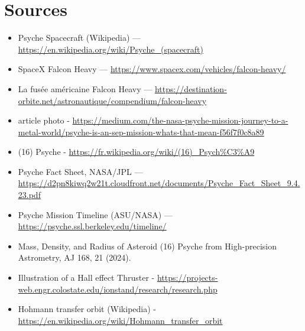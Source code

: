 \documentclass[11pt,a4paper]{article}
\begin{document}
\newpage

\section*{Sources}

\begin{itemize}
    \item [1] Psyche Spacecraft (Wikipedia) — \url{https://en.wikipedia.org/wiki/Psyche_(spacecraft)}
    \item [2] SpaceX Falcon Heavy — \url{https://www.spacex.com/vehicles/falcon-heavy/}
    \item [3] La fusée américaine Falcon Heavy — \url{https://destination-orbite.net/astronautique/compendium/falcon-heavy}
    \item [4] article photo - \url{https://medium.com/the-nasa-psyche-mission-journey-to-a-metal-world/psyche-is-an-sep-mission-whats-that-mean-f56f7f0c8a89}
    \item [5] (16) Psyche - \url{https://fr.wikipedia.org/wiki/(16)_Psych%C3%A9}
    \item [6] Psyche Fact Sheet, NASA/JPL — \url{https://d2pn8kiwq2w21t.cloudfront.net/documents/Psyche_Fact_Sheet_9.4.23.pdf}
    \item [7] Psyche Mission Timeline (ASU/NASA) — \url{https://psyche.ssl.berkeley.edu/timeline/}
    \item [8] Mass, Density, and Radius of Asteroid (16) Psyche from High-precision Astrometry, AJ 168, 21 (2024).
    \item [9] Illustration of a Hall effect Thruster - \url{https://projects-web.engr.colostate.edu/ionstand/research/research.php}
    \item [10] Hohmann transfer orbit (Wikipedia) - \url{https://en.wikipedia.org/wiki/Hohmann_transfer_orbit}
\end{itemize}
\end{document}
